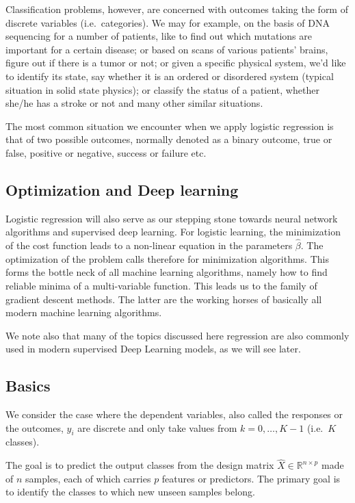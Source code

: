 \documentclass[%
oneside,                 %
final,                   %
10pt]{article}
\begin{document}
Classification problems, however, are concerned with outcomes taking
the form of discrete variables (i.e.~categories). We may for example,
on the basis of DNA sequencing for a number of patients, like to find
out which mutations are important for a certain disease; or based on
scans of various patients' brains, figure out if there is a tumor or
not; or given a specific physical system, we'd like to identify its
state, say whether it is an ordered or disordered system (typical
situation in solid state physics); or classify the status of a
patient, whether she/he has a stroke or not and many other similar
situations.

The most common situation we encounter when we apply logistic
regression is that of two possible outcomes, normally denoted as a
binary outcome, true or false, positive or negative, success or
failure etc.

\subsection{Optimization and Deep learning}

Logistic regression will also serve as our stepping stone towards neural
network algorithms and supervised deep learning. For logistic
learning, the minimization of the cost function leads to a non-linear
equation in the parameters $\hat{\beta}$. The optimization of the problem calls therefore for minimization algorithms. This forms the bottle neck of all machine learning algorithms, namely how to find reliable minima of a multi-variable function. This leads us to the family of gradient descent methods. The latter are the working horses of basically all modern machine learning algorithms. 

We note also that many of the topics discussed here 
regression are also commonly used in modern supervised Deep Learning
models, as we will see later.


\subsection{Basics}

We consider the case where the dependent variables, also called the
responses or the outcomes, $y_i$ are discrete and only take values
from $k=0,\dots,K-1$ (i.e.~$K$ classes).

The goal is to predict the
output classes from the design matrix $\hat{X}\in\mathbb{R}^{n\times p}$
made of $n$ samples, each of which carries $p$ features or predictors. The
primary goal is to identify the classes to which new unseen samples
belong.
\end{document}
